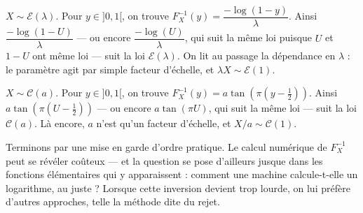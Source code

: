 \begin{exemple}
$X \sim \mathcal{E}(\lambda)$. Pour $y \in ]0, 1[$, on trouve $F_X^{-1}(y) = \dfrac{-\log(1 - y)}{\lambda}$. Ainsi $\dfrac{-\log(1 - U)}{\lambda}$ — ou encore $\dfrac{-\log(U)}{\lambda}$, qui suit la même loi puisque $U$ et $1 - U$ ont même loi — suit la loi $\mathcal{E}(\lambda)$. On lit au passage la dépendance en $\lambda$ : le paramètre agit par simple facteur d'échelle, et $\lambda X \sim \mathcal{E}(1)$.
\end{exemple}

\begin{exemple}
$X \sim \mathcal{C}(a)$. Pour $y \in ]0, 1[$, on trouve $F_X^{-1}(y) = a \tan\!\left(\pi\left(y - \tfrac{1}{2}\right)\right)$. Ainsi $a \tan\!\left(\pi\left(U - \tfrac{1}{2}\right)\right)$ — ou encore $a \tan(\pi U)$, qui suit la même loi — suit la loi $\mathcal{C}(a)$. Là encore, $a$ n'est qu'un facteur d'échelle, et $X/a \sim \mathcal{C}(1)$.
\end{exemple}

Terminons par une mise en garde d'ordre pratique. Le calcul numérique de $F_X^{-1}$ peut se révéler coûteux — et la question se pose d'ailleurs jusque dans les fonctions élémentaires qui y apparaissent : comment une machine calcule-t-elle un logarithme, au juste ? Lorsque cette inversion devient trop lourde, on lui préfère d'autres approches, telle la méthode dite du rejet.